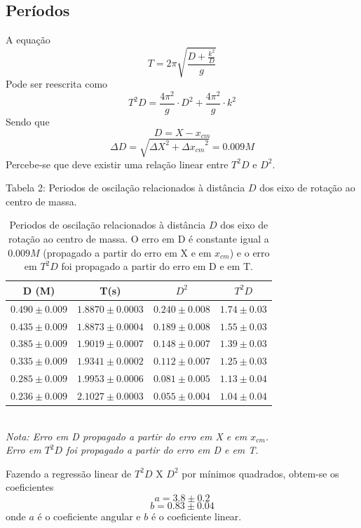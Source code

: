 \documentclass[12pt,a4paper]{article}
\begin{document}
\subsection{Períodos}
A equação $$ T = 2\pi\sqrt{\frac{D + \frac{k^2}{D}}{g}} $$ 
Pode ser reescrita como 
\begin{equation} \label{eq:funcao}
 T^2D = \frac{4\pi^2}{g} \cdot D^2 + \frac{4\pi^2}{g} \cdot k^2 
\end{equation}
Sendo que $$D = X - x_{cm} $$ 
$$ \Delta D = \sqrt{{\Delta X}^2 + {\Delta x_{cm}}^2}  = 0.009M$$
Percebe-se que deve existir uma relação linear entre $T^2D$ e $D^2$.
\newpage


  
\begin{table}[!htbp]
\caption{Periodos de oscilação relacionados à distância $D$ dos eixo de rotação ao centro de massa. O erro em D é constante igual a $0.009 M$ (propagado a partir do erro em X e em $x_{cm}$) e o erro em $T^2D$ foi propagado a partir do erro em D e em T.}
\def\arraystretch{1.5}

{Tabela 2: Periodos de oscilação relacionados à distância $D$ dos eixo de rotação ao centro de massa.}\\[10pt]

\begin{tabular}{|c|c|c|c|}
\hline
D (M)& T(s) & $D^2$ & $T^2D$ \\
\hline
$0.490\pm0.009$ & $1.8870 \pm 0.0003$ & $0.240\pm0.008$ & $1.74 \pm 0.03$\\
\hline
$0.435\pm0.009$ & $1.8873 \pm 0.0004$ & $0.189\pm0.008$ & $1.55 \pm 0.03$\\
\hline
$0.385\pm0.009$ & $1.9019 \pm 0.0007$ & $0.148\pm0.007$ & $1.39 \pm 0.03$\\
\hline
$0.335\pm0.009$ & $1.9341 \pm 0.0002$ & $0.112\pm0.007$ & $1.25 \pm 0.03$\\
\hline
$0.285\pm0.009$ & $1.9953 \pm 0.0006$ & $0.081\pm0.005$ & $1.13 \pm 0.04$\\
\hline
$0.236\pm0.009$ & $2.1027 \pm 0.0003$ & $0.055\pm0.004$ & $1.04 \pm 0.04$\\
\hline
\end{tabular}
\\
\emph {Nota: Erro em D propagado a partir do erro em X e em $x_{cm}$.\\
			Erro em $T^2D$ foi propagado a partir do erro em D e em T.\\}
\end{table}

Fazendo a regressão linear de $T^2D$ X $D^2$ por mínimos quadrados, obtem-se os coeficientes $$ a = 3.8 \pm 0.2 $$  $$ b = 0.83 \pm 0.04 $$ onde $a$ é o coeficiente angular e $b$ é o coeficiente linear.
\end{document}
